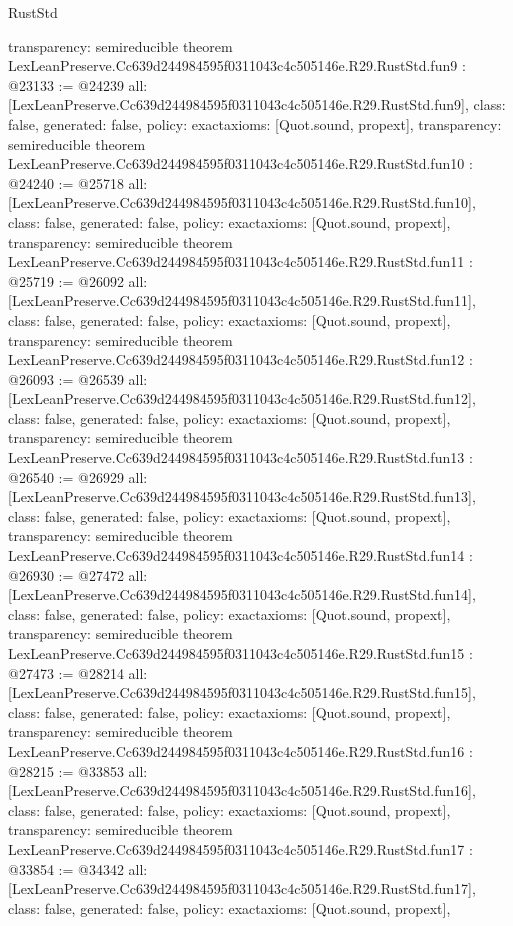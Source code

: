 \begin{lexlean}{RustStd}
\begin{coremodule}
{  transparency: semireducible
}
theorem LexLeanPreserve.Cc639d244984595f0311043c4c505146e.R29.RustStd.fun9 : @23133 := @24239 {
  all: [LexLeanPreserve.Cc639d244984595f0311043c4c505146e.R29.RustStd.fun9],
  class: false,
  generated: false,
  policy: exact{axioms: [Quot.sound, propext]},
  transparency: semireducible
}
theorem LexLeanPreserve.Cc639d244984595f0311043c4c505146e.R29.RustStd.fun10 : @24240 := @25718 {
  all: [LexLeanPreserve.Cc639d244984595f0311043c4c505146e.R29.RustStd.fun10],
  class: false,
  generated: false,
  policy: exact{axioms: [Quot.sound, propext]},
  transparency: semireducible
}
theorem LexLeanPreserve.Cc639d244984595f0311043c4c505146e.R29.RustStd.fun11 : @25719 := @26092 {
  all: [LexLeanPreserve.Cc639d244984595f0311043c4c505146e.R29.RustStd.fun11],
  class: false,
  generated: false,
  policy: exact{axioms: [Quot.sound, propext]},
  transparency: semireducible
}
theorem LexLeanPreserve.Cc639d244984595f0311043c4c505146e.R29.RustStd.fun12 : @26093 := @26539 {
  all: [LexLeanPreserve.Cc639d244984595f0311043c4c505146e.R29.RustStd.fun12],
  class: false,
  generated: false,
  policy: exact{axioms: [Quot.sound, propext]},
  transparency: semireducible
}
theorem LexLeanPreserve.Cc639d244984595f0311043c4c505146e.R29.RustStd.fun13 : @26540 := @26929 {
  all: [LexLeanPreserve.Cc639d244984595f0311043c4c505146e.R29.RustStd.fun13],
  class: false,
  generated: false,
  policy: exact{axioms: [Quot.sound, propext]},
  transparency: semireducible
}
theorem LexLeanPreserve.Cc639d244984595f0311043c4c505146e.R29.RustStd.fun14 : @26930 := @27472 {
  all: [LexLeanPreserve.Cc639d244984595f0311043c4c505146e.R29.RustStd.fun14],
  class: false,
  generated: false,
  policy: exact{axioms: [Quot.sound, propext]},
  transparency: semireducible
}
theorem LexLeanPreserve.Cc639d244984595f0311043c4c505146e.R29.RustStd.fun15 : @27473 := @28214 {
  all: [LexLeanPreserve.Cc639d244984595f0311043c4c505146e.R29.RustStd.fun15],
  class: false,
  generated: false,
  policy: exact{axioms: [Quot.sound, propext]},
  transparency: semireducible
}
theorem LexLeanPreserve.Cc639d244984595f0311043c4c505146e.R29.RustStd.fun16 : @28215 := @33853 {
  all: [LexLeanPreserve.Cc639d244984595f0311043c4c505146e.R29.RustStd.fun16],
  class: false,
  generated: false,
  policy: exact{axioms: [Quot.sound, propext]},
  transparency: semireducible
}
theorem LexLeanPreserve.Cc639d244984595f0311043c4c505146e.R29.RustStd.fun17 : @33854 := @34342 {
  all: [LexLeanPreserve.Cc639d244984595f0311043c4c505146e.R29.RustStd.fun17],
  class: false,
  generated: false,
  policy: exact{axioms: [Quot.sound, propext]},
}
\end{coremodule}
\end{lexlean}
